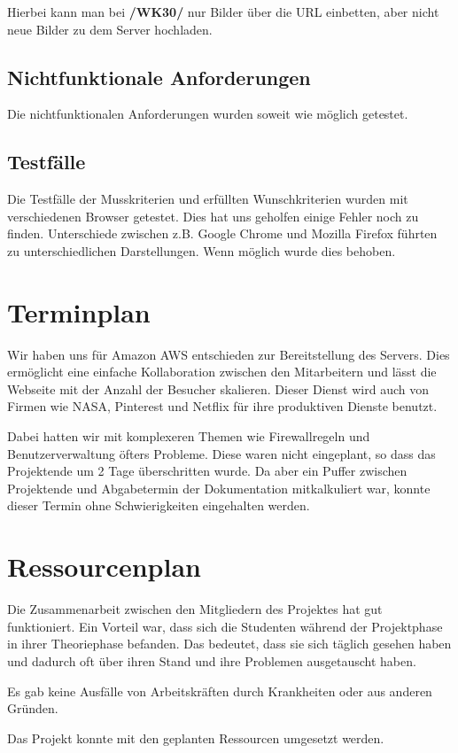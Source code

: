 \documentclass{article}
\begin{document}
\noindent Hierbei kann man bei \textbf{/WK30/} nur Bilder über die URL einbetten, aber nicht neue Bilder zu dem Server hochladen.

\subsection{Nichtfunktionale Anforderungen}
Die nichtfunktionalen Anforderungen wurden soweit wie möglich getestet.

\subsection{Testfälle}
Die Testfälle der Musskriterien und erfüllten Wunschkriterien wurden mit verschiedenen Browser getestet. Dies hat uns geholfen einige Fehler noch zu finden. Unterschiede zwischen z.B. Google Chrome und Mozilla Firefox führten zu unterschiedlichen Darstellungen. Wenn möglich wurde dies behoben.

\section{Terminplan}
Wir haben uns für Amazon AWS entschieden zur Bereitstellung des Servers. Dies ermöglicht eine einfache Kollaboration zwischen den Mitarbeitern und lässt die Webseite mit der Anzahl der Besucher skalieren. Dieser Dienst wird auch von Firmen wie NASA, Pinterest und Netflix für ihre produktiven Dienste benutzt.

Dabei hatten wir mit komplexeren Themen wie Firewallregeln und Benutzerverwaltung öfters Probleme. Diese waren nicht eingeplant, so dass das Projektende um 2 Tage überschritten wurde. Da aber ein Puffer zwischen Projektende und Abgabetermin der Dokumentation mitkalkuliert war, konnte dieser Termin ohne Schwierigkeiten eingehalten werden.


\section{Ressourcenplan}
Die Zusammenarbeit zwischen den Mitgliedern des Projektes hat gut funktioniert. Ein Vorteil war, dass sich die Studenten während der Projektphase in ihrer Theoriephase befanden. Das bedeutet, dass sie sich täglich gesehen haben und dadurch oft über ihren Stand und ihre Problemen ausgetauscht haben.

\smallskip
\noindent Es gab keine Ausfälle von Arbeitskräften durch Krankheiten oder aus anderen Gründen.

\smallskip
\noindent Das Projekt konnte mit den geplanten Ressourcen umgesetzt werden.
\end{document}
